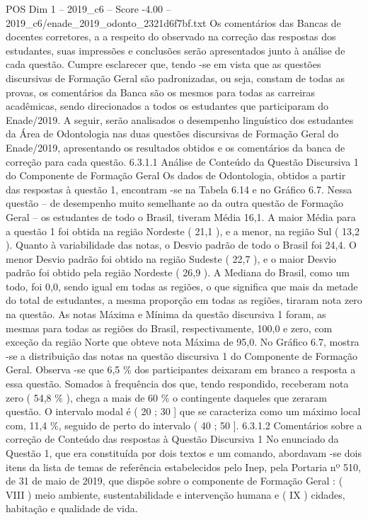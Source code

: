 \begin{textsample}{POS Dim 1 – 2019\_c6 – Score -4.00 – 2019\_c6/enade\_2019\_odonto\_2321d6f7bf.txt}
Os comentários das Bancas de docentes corretores, a a respeito do observado na correção das respostas dos estudantes, suas impressões e conclusões serão apresentados junto à análise de cada questão.
Cumpre esclarecer que, tendo -se em vista que as questões discursivas de Formação Geral são padronizadas, ou seja, constam de todas as provas, os comentários da Banca são os mesmos para todas as carreiras acadêmicas, sendo direcionados a todos os estudantes que participaram do Enade/2019.
A seguir, serão analisados o desempenho linguístico dos estudantes da Área de Odontologia nas duas questões discursivas de Formação Geral do Enade/2019, apresentando os resultados obtidos e os comentários da banca de correção para cada questão. 6.3.1.1 Análise de Conteúdo da Questão Discursiva 1 do Componente de Formação Geral Os dados de Odontologia, obtidos a partir das respostas à questão 1, encontram -se na Tabela 6.14 e no Gráfico 6.7.
Nessa questão – de desempenho muito semelhante ao da outra questão de Formação Geral – os estudantes de todo o Brasil, tiveram Média 16,1.
A maior Média para a questão 1 foi obtida na região Nordeste ( 21,1 ), e a menor, na região Sul ( 13,2 ).
Quanto à variabilidade das notas, o Desvio padrão de todo o Brasil foi 24,4.
O menor Desvio padrão foi obtido na região Sudeste ( 22,7 ), e o maior Desvio padrão foi obtido pela região Nordeste ( 26,9 ).
A Mediana do Brasil, como um todo, foi 0,0, sendo igual em todas as regiões, o que significa que mais da metade do total de estudantes, a mesma proporção em todas as regiões, tiraram nota zero na questão.
As notas Máxima e Mínima da questão discursiva 1 foram, as mesmas para todas as regiões do Brasil, respectivamente, 100,0 e zero, com exceção da região Norte que obteve nota Máxima de 95,0.
No Gráfico 6.7, mostra -se a distribuição das notas na questão discursiva 1 do Componente de Formação Geral.
Observa -se que 6,5 \% dos participantes deixaram em branco a resposta a essa questão.
Somados à frequência dos que, tendo respondido, receberam nota zero ( 54,8 \% ), chega a mais de 60 \% o contingente daqueles que zeraram questão.
O intervalo modal é ( 20 ; 30 ] que se caracteriza como um máximo local com, 11,4 \%, seguido de perto do intervalo ( 40 ; 50 ]. 6.3.1.2 Comentários sobre a correção de Conteúdo das respostas à Questão Discursiva 1 No enunciado da Questão 1, que era constituída por dois textos e um comando, abordavam -se dois itens da lista de temas de referência estabelecidos pelo Inep, pela Portaria nº 510, de 31 de maio de 2019, que dispõe sobre o componente de Formação Geral : ( VIII ) meio ambiente, sustentabilidade e intervenção humana e ( IX ) cidades, habitação e qualidade de vida.

\end{textsample}
